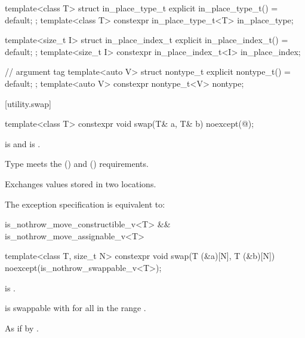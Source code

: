 \begin{codeblock}
{  template<class T>
    struct in_place_type_t {
      explicit in_place_type_t() = default;
    };
  template<class T> constexpr in_place_type_t<T> in_place_type{};

  template<size_t I>
    struct in_place_index_t {
      explicit in_place_index_t() = default;
    };
  template<size_t I> constexpr in_place_index_t<I> in_place_index{};

  //  argument tag%
%
  template<auto V>
    struct nontype_t {
      explicit nontype_t() = default;
    };
  template<auto V> constexpr nontype_t<V> nontype{};
}
\end{codeblock}

[utility.swap]{}

%
\begin{itemdecl}
template<class T>
  constexpr void swap(T& a, T& b) noexcept(@\seebelow@);
\end{itemdecl}

\begin{itemdescr}
\pnum
\constraints
{} is  and
 is .

\pnum
\expects
Type
meets the
 ()
and
 ()
requirements.

\pnum
\effects
Exchanges values stored in two locations.

\pnum
\remarks
The exception specification is equivalent to:

\begin{codeblock}
is_nothrow_move_constructible_v<T> && is_nothrow_move_assignable_v<T>
\end{codeblock}
\end{itemdescr}

%
\begin{itemdecl}
template<class T, size_t N>
  constexpr void swap(T (&a)[N], T (&b)[N]) noexcept(is_nothrow_swappable_v<T>);
\end{itemdecl}

\begin{itemdescr}
\pnum
\constraints
{} is .

\pnum
\expects
{} is swappable with 
for all  in the range .

\pnum
\effects
As if by .
\end{itemdescr}

